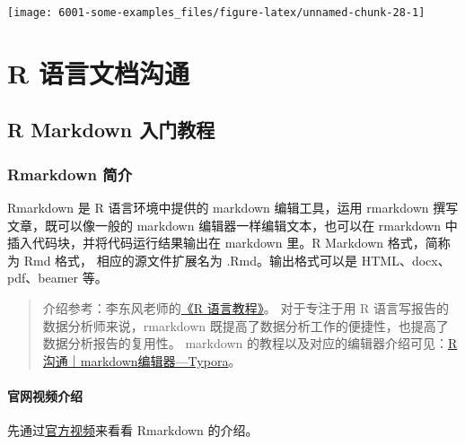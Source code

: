 \documentclass[
]{book}
\begin{document}
\begin{center}\texttt{[image: 6001-some-examples\_files/figure-latex/unnamed-chunk-28-1]} \end{center}

\hypertarget{part-r-ux8bedux8a00ux6587ux6863ux6c9fux901a}{%
\part{R 语言文档沟通}\label{part-r-ux8bedux8a00ux6587ux6863ux6c9fux901a}}

\hypertarget{rmarkdown-base}{%
\chapter{R Markdown 入门教程}\label{rmarkdown-base}}

\hypertarget{rmarkdown-ux7b80ux4ecb}{%
\section{Rmarkdown 简介}\label{rmarkdown-ux7b80ux4ecb}}

Rmarkdown 是 R 语言环境中提供的 markdown 编辑工具，运用 rmarkdown
撰写文章，既可以像一般的 markdown 编辑器一样编辑文本，也可以在 rmarkdown
中插入代码块，并将代码运行结果输出在 markdown 里。R Markdown
格式，简称为 Rmd 格式， 相应的源文件扩展名为 .Rmd。输出格式可以是
HTML、docx、pdf、beamer 等。

\begin{quote}
介绍参考：李东风老师的\href{https://www.math.pku.edu.cn/teachers/lidf/docs/Rbook/html/_Rbook/rmarkdown.html}{《R
语言教程》}。
对于专注于用 R 语言写报告的数据分析师来说，rmarkdown
既提高了数据分析工作的便捷性，也提高了数据分析报告的复用性。 markdown
的教程以及对应的编辑器介绍可见：\href{http://mp.weixin.qq.com/s?__biz=MzI1NjUwMjQxMQ==\&mid=2247491318\&idx=1\&sn=47128737582a34677926a9f64f03e4ed\&chksm=ea24e112dd53680478ac90151554ebdde72ab122fcc84bae4da6e87e9c97b020275ecabc846c\&scene=21\#wechat_redirect}{R沟通｜markdown编辑器---Typora}。
\end{quote}

\hypertarget{ux5b98ux7f51ux89c6ux9891ux4ecbux7ecd}{%
\subsection{官网视频介绍}\label{ux5b98ux7f51ux89c6ux9891ux4ecbux7ecd}}

先通过\href{https://rmarkdown.rstudio.com/lesson-1.html}{官方视频}来看看
Rmarkdown 的介绍。
\end{document}
